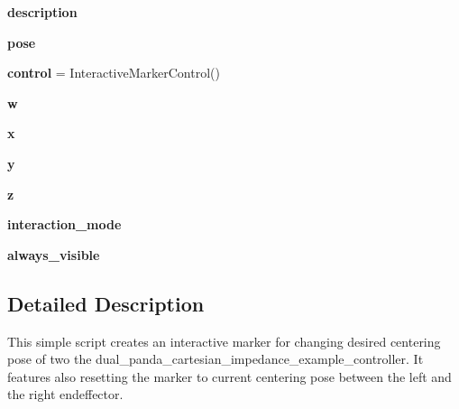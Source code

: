 \begin{DoxyCompactItemize}
\item 
\mbox{\label{namespacedual__arm__interactive__marker_a8908f0309762fc6b58438bbe9df01ac6}} 
{\bfseries description}
\item 
\mbox{\label{namespacedual__arm__interactive__marker_ad1096317d9fe655130ffd6bda9645bbd}} 
{\bfseries pose}
\item 
\mbox{\label{namespacedual__arm__interactive__marker_a3ec82817bea92c3e2ce70682f3b6d2ab}} 
{\bfseries control} = Interactive\+Marker\+Control()
\item 
\mbox{\label{namespacedual__arm__interactive__marker_a586f29d31b76a5c3a968627bf51129c7}} 
{\bfseries w}
\item 
\mbox{\label{namespacedual__arm__interactive__marker_a622e063064f4b6c5718471de259adb6d}} 
{\bfseries x}
\item 
\mbox{\label{namespacedual__arm__interactive__marker_a3f9e7d16da8f43f59095da0393541a11}} 
{\bfseries y}
\item 
\mbox{\label{namespacedual__arm__interactive__marker_aee749b160baf172d0162bc67af46c52d}} 
{\bfseries z}
\item 
\mbox{\label{namespacedual__arm__interactive__marker_abe224eacf607f80c0bb2c0f5389d5996}} 
{\bfseries interaction\+\_\+mode}
\item 
\mbox{\label{namespacedual__arm__interactive__marker_a0c4e88aa8a5fd1ea5f74912786ce11f3}} 
{\bfseries always\+\_\+visible}
\end{DoxyCompactItemize}


\subsection{Detailed Description}
\begin{DoxyVerb}This simple script creates an interactive marker for changing desired centering pose of
    two the dual_panda_cartesian_impedance_example_controller. It features also resetting the
    marker to current centering pose between the left and the right endeffector.
\end{DoxyVerb}
 

